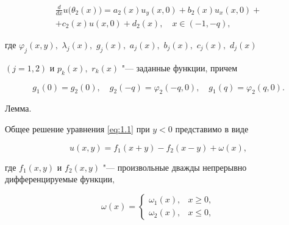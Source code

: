 \begin{itemize}
\begin{multline}
\frac{d}{{dx}}u\bigl(\theta _2(x)\bigr) 

= {a_2}(x){u_y}(x, 0) + {b_2}(x){u_x}(x, 0) + \\ + {c_2}(x)u(x, 0) + {d_2}(x),\quad  x \in (- 1,- q),\label{eq:6.2}

\end{multline}

где ${\varphi _j}(x,y),$ ${\lambda _j}(x),$ ${g_j}(x),$ ${a_j}(x),$ ${b_j}(x),$ ${c_j}(x),$ ${d_j}(x)$ 

$(j = 1, 2)$ и $p_k(x),$ $r_k (x)$ "--- заданные функции, причем

\begin{equation}

{g_1}( 0 ) = {g_2}(0),\quad 

{g_2}(  - q) = {\varphi _2}( - q, 0),\quad 

{g_1}( q ) = {\varphi _2}(q, 0).

\label{eq:1.7}

\end{equation}





\end{itemize}



\rm 



\smallskip



{\sc\small Лемма.} 

\it 

Общее решение уравнения \eqref{eq:1.1} при $y < 0$ представимо в виде

\begin{equation}

u(x,y) = {f_1}(x + y) - {f_2}(x - y) + \omega (x),

\label{eq:1.8}

\end{equation}

где ${f_1}(x,y)$ и ${f_2}(x,y)$ "--- произвольные дважды непрерывно дифференцируемые функции$,$ 

$$\omega (x) = 

\left\{ \begin{array}{ll}

{\omega _1}(x), & x \ge 0,\\

{\omega _2}(x), & x \le 0,

\end{array} \right.$$  

